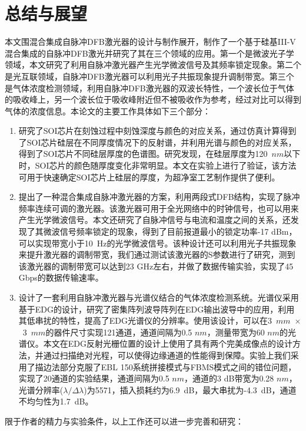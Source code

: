 \chapter{总结与展望}
本文围混合集成自脉冲DFB激光器的设计与制作展开，制作了一个基于硅基III-V混合集成的自脉冲DFB激光并研究了其在三个领域的应用。第一个是微波光子学领域，本文研究了利用自脉冲激光器产生光学微波信号及其频率锁定现象。第二个是光互联领域，自脉冲DFB激光器可以利用光子共振现象提升调制带宽。第三个是气体浓度检测领域，利用自脉冲DFB激光器的双波长特性，一个波长位于气体的吸收峰上，另一个波长位于吸收峰附近但不被吸收作为参考，经过对比可以得到气体的浓度信息。本论文的主要工作具体如下三个部分：

\begin{enumerate}[(1)]
	\item 
	研究了SOI芯片在刻蚀过程中刻蚀深度与颜色的对应关系，通过仿真计算得到了SOI芯片硅层在不同厚度情况下的反射谱，并利用光谱与颜色的对应关系，得到了SOI芯片不同硅层厚度的色谱图。研究发现，在硅层厚度为120~$nm$以下时，SOI芯片的颜色随厚度变化非常明显。本文在实验上进行了验证，该方法可用于快速确定SOI芯片上硅层的厚度，为超净室工艺制作提供了便利。
	\item 
	提出了一种混合集成自脉冲激光器的方案，利用两段式DFB结构，实现了脉冲频率连续可调的激光器。该激光器可用于全光网络中的时钟信号，也可以用来产生光学微波信号。本文还研究了自脉冲信号与电流和温度之间的关系，还发现了其微波信号频率锁定的现象，得到了目前报道最小的锁定功率-17 dBm，可以实现带宽小于10~Hz的光学微波信号。该种设计还可以利用光子共振现象来提升激光器的调制带宽，我们通过测试该激光器的S参数进行了研究，测到该激光器的调制带宽可以达到23 GHz左右，并做了数据传输实验，实现了45 Gbps的数据传输速率。
	\item 
	设计了一套利用自脉冲激光器与光谱仪结合的气体浓度检测系统。光谱仪采用基于EDG的设计，研究了密集阵列波导阵列在EDG输出波导中的应用，利用其低串扰的特性，提高了EDG光谱仪的分辨率。使用该设计，可以在3~$mm$~$\times$~3~$mm$的器件尺寸实现121通道，通道间隔为0.5 $nm$，测量带宽为60 $nm$的光谱仪。本文在EDG反射光栅位置的设计上使用了具有两个完美成像点的设计方法，并通过扫描绝对光程，可以使得边缘通道的性能得到保障。实验上我们采用了描边法部分克服了EBL 150系统拼接模式与FBMS模式之间的错位问题，实现了20通道的实验结果，通道间隔为0.5 $nm$，通道的3 dB带宽为0.28 $nm$，光谱分辨率($\lambda/\Delta\lambda$)为5571，插入损耗约为6.9~dB，最大串扰为-4.3~dB，通道不均匀性为1.7~dB。
	
\end{enumerate}

限于作者的精力与实验条件，以上工作还可以进一步完善和研究：

